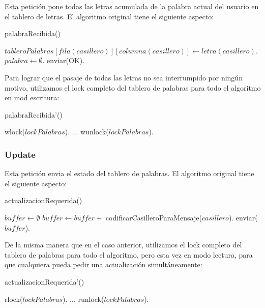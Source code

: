 Esta petición pone todas las letras acumulada de la palabra actual del usuario en el tablero de letras. El algoritmo original tiene el siguiente aspecto:

\begin{algorithm}[H]
\caption{palabraRecibida()}
\begin{algorithmic}[1]
        \STATE $tableroPalabras[fila(casillero)][columna(casillero)] \leftarrow letra(casillero)$.
    \ENDFOR
    \STATE $palabra \leftarrow \emptyset$.
    \STATE enviar(OK).
\end{algorithmic}
\end{algorithm}

\noindent Para lograr que el pasaje de todas las letras no sea interrumpido por ningún motivo, utilizamos el lock completo del tablero de palabras para todo el algoritmo en mod escritura:

\begin{algorithm}[H]
\caption{palabraRecibida'()}
\begin{algorithmic}[1]
    \STATE wlock($lockPalabras$).
    \STATE ...
    \STATE wunlock($lockPalabras$).
\end{algorithmic}
\end{algorithm}

\subsubsection{Update}

Esta petición envia el estado del tablero de palabras. El algoritmo original tiene el siguiente aspecto:

\begin{algorithm}[H]
\caption{actualizacionRequerida()}
\begin{algorithmic}[1]
    \STATE $buffer \leftarrow \emptyset$
        \STATE $buffer \leftarrow buffer +$ codificarCasilleroParaMensaje($casillero$).
    \ENDFOR
    \STATE enviar($buffer$).
\end{algorithmic}
\end{algorithm}

\noindent De la misma manera que en el caso anterior, utilizamos el lock completo del tablero de palabras para todo el algoritmo, pero esta vez en modo lectura, para que cualquiera pueda pedir una actualización simultáneamente:

\begin{algorithm}[H]
\caption{actualizacionRequerida'()}
\begin{algorithmic}[1]
    \STATE rlock($lockPalabras$).
    \STATE ...
    \STATE runlock($lockPalabras$).
\end{algorithmic}
\end{algorithm}